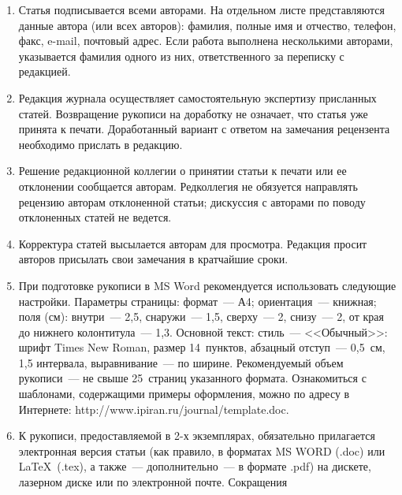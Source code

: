 {{\begin{enumerate}
Указанное соглашение может быть представлено 
как в бумажном виде, так и в виде отсканированной копии (с подписями авторов).


Редколлегия вправе запросить у авторов экспертное заключение о возможности
опубликования представленной статьи в открытой печати. %
\item Статья
подписывается всеми авторами. На отдельном листе представляются данные автора
(или всех авторов): фамилия, полные имя и отчество, телефон, факс, e-mail,
почтовый адрес. Если работа выполнена несколькими авторами, указывается фамилия
одного из них, ответственного за переписку с редакцией. %
\item Редакция журнала
осуществляет самостоятельную экспертизу присланных статей. Возвращение рукописи
на доработку не означает, что статья уже принята к печати. Доработанный вариант
с ответом на замечания рецензента необходимо прислать в редакцию. %
\item Решение
редакционной коллегии о принятии статьи к печати или ее отклонении сообщается
авторам. Редколлегия не обязуется направлять рецензию авторам отклоненной
статьи; дискуссия с авторами по поводу отклоненных статей не ведется. %
\item Корректура статей высылается авторам для просмотра. Редакция
просит авторов присылать свои замечания в кратчайшие сроки. %
\item При
подготовке рукописи в MS Word рекомендуется использовать следующие настройки.
Параметры страницы: формат~--- А4; ориентация~--- книжная; поля (см): внутри~---
2,5, снаружи~--- 1,5, сверху~--- 2, снизу~--- 2, от края до нижнего
колонтитула~--- 1,3. Основной текст: стиль~--- <<Обычный>>: шрифт Times New
Roman, размер 14~пунктов, абзацный отступ~--- 0,5~см, 1,5 интервала,
выравнивание~--- по ширине. Рекомендуемый объем рукописи~--- не свыше
25~страниц указанного формата. Ознакомиться с шаблонами, содержащими примеры
оформления, можно по адресу в Интернете:
\textsf{http://www.ipiran.ru/journal/template.doc}.
\item К рукописи, предоставляемой в 2-х
экземплярах, обязательно прилагается электронная версия статьи (как правило, в
форматах MS WORD (.doc) или \LaTeX\ (.tex), а также~--- дополнительно~--- в
формате .pdf) на дискете, лазерном диске или по электронной почте. Сокращения

\end{enumerate}}}
